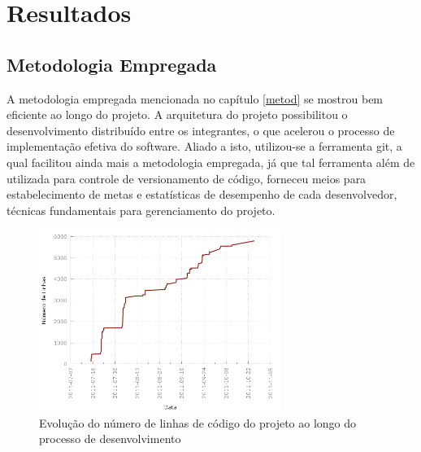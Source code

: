 \chapter{Resultados}
\label{chap:result}

\section{Metodologia Empregada}

A metodologia empregada mencionada no capítulo \ref{metod} se mostrou bem eficiente ao longo do projeto.
A arquitetura do projeto possibilitou o desenvolvimento distribuído entre os integrantes, o que acelerou o processo de implementação efetiva do software.
Aliado a isto, utilizou-se a ferramenta git, a qual facilitou ainda mais a metodologia empregada, já que tal ferramenta além de utilizada para controle de versionamento de código, forneceu meios para estabelecimento de metas e estatísticas de desempenho de cada desenvolvedor, técnicas fundamentais para gerenciamento do projeto.



\begin{figure}[!htb]
	\centering
	\includegraphics[width=0.7\textwidth]{./plots/lines_of_code.png}
	\caption[Evolução do número de linhas de código do projeto]{Evolução do número de linhas de código do projeto ao longo do processo de desenvolvimento}
	\label{fig:linesofcode}
\end{figure}

